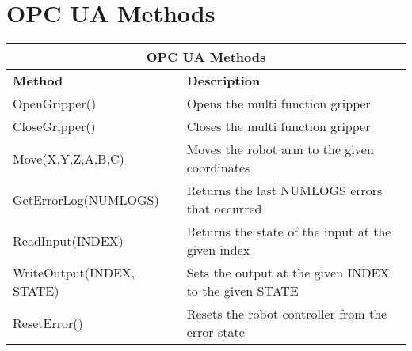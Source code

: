 \documentclass{article}
\begin{document}
\section{OPC UA Methods}
\begin{center}
	\setlength\extrarowheight{4pt}
	\small
	\begin{tabularx}{\textwidth}{|p{5cm}|X|}
		\hline
		\multicolumn{2}{|c|}{\bf \color{black} \large OPC UA Methods}\\
		\hline\hline
		\bf Method &\bf Description\\
		\hline\hline
		OpenGripper() & Opens the multi function gripper\\
		\hline
		CloseGripper() & Closes the multi function gripper\\
		\hline
		Move(X,Y,Z,A,B,C) & Moves the robot arm to the given coordinates\\
		\hline
		GetErrorLog(NUMLOGS) & Returns the last NUMLOGS errors that occurred\\
		\hline
		ReadInput(INDEX) & Returns the state of the input at the given index\\
		\hline
		WriteOutput(INDEX, STATE) & Sets the output at the given INDEX to the given STATE\\
		\hline
		ResetError() & Resets the robot controller from the error state\\
		\hline
	\end{tabularx}
\end{center}
\end{document}
